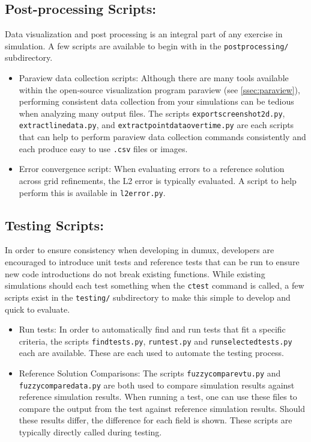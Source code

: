 \subsection{Post-processing Scripts:} \label{ssec:postprocessingScripts}
Data visualization and post processing is an integral part of any exercise in simulation. A few scripts are available to begin with in the \texttt{postprocessing/} subdirectory. 
\begin{itemize}
	\item Paraview data collection scripts: Although there are many tools available within the open-source visualization program paraview (see \ref{ssec:paraview}), performing consistent data collection from your simulations can be tedious when analyzing many output files. The scripts \texttt{exportscreenshot2d.py}, \texttt{extractlinedata.py}, and \texttt{extractpointdataovertime.py} are each scripts that can help to perform paraview data collection commands consistently and each produce easy to use \texttt{.csv} files or images. 
	\item Error convergence script: When evaluating errors to a reference solution across grid refinements, the L2 error is typically evaluated. A script to help perform this is available in \texttt{l2error.py}.
\end{itemize}

\subsection{Testing Scripts:} \label{ssec:testingScripts}
In order to ensure consistency when developing in dumux, developers are encouraged to introduce unit tests and reference tests that can be run to ensure new code introductions do not break existing functions. While existing simulations should each test something when the \texttt{ctest} command is called, a few scripts exist in the \texttt{testing/} subdirectory to make this simple to develop and quick to evaluate.
\begin{itemize}
	\item Run tests: In order to automatically find and run tests that fit a specific criteria, the scripts \texttt{findtests.py}, \texttt{runtest.py} and \texttt{runselectedtests.py} each are available. These are each used to automate the testing process.  
	\item Reference Solution Comparisons: The scripts \texttt{fuzzycomparevtu.py} and \texttt{fuzzycomparedata.py} are both used to compare simulation results against reference simulation results. When running a test, one can use these files to compare the output from the test against reference simulation results. Should these results differ, the difference for each field is shown. These scripts are typically directly called during testing. 
\end{itemize}

